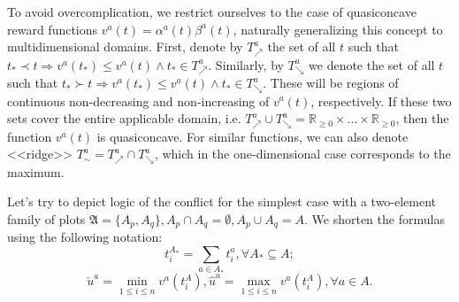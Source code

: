 To avoid overcomplication, we restrict ourselves to the case of quasiconcave reward functions $v^a(t) = \alpha^a(t) \beta^a(t)$, naturally generalizing this concept to multidimensional domains. First, denote by $T^a_{\nearrow}$ the set of all $t$ such that $t_* \prec t \Rightarrow v^a(t_*) \le v^a(t) \wedge t_* \in T^a_{\nearrow}$. Similarly, by $T^a_{\searrow}$ we denote the set of all $t$ such that $t_* \succ t \Rightarrow v^a(t_*) \le v^a(t) \wedge t_* \in T^a_{\searrow}$. These will be regions of continuous non-decreasing and non-increasing of $v^a(t)$, respectively. If these two sets cover the entire applicable domain, i.e. $T^a_{\nearrow} \cup T^a_{\searrow} = \mathbb{R}_{\ge 0} \times \ldots \times \mathbb{R}_{\ge 0}$, then the function $v^a(t)$ is quasiconcave. For similar functions, we can also denote <<ridge>> $T^a_{\sim} = T^a_{\nearrow} \cap T^a_{\searrow}$, which in the one-dimensional case corresponds to the maximum. %

Let's try to depict logic of the conflict for the simplest case with a two-element family of plots $\mathfrak{A} = \{A_p, A_q\}, A_p \cap A_q = \emptyset, A_p \cup A_q = A$. We shorten the formulas using the following notation: %
\begin{equation*}
	t_i^{A_*} = \sum_{a \in A_*} t_i^a, \forall A_* \subseteq A;
\end{equation*}
\begin{equation*}
	\check{u}^a = \min_{1 \le i \le n} v^a(t_i^A), \hat{u}^a = \max_{1 \le i \le n} v^a(t_i^A), \forall a \in A.
\end{equation*}

